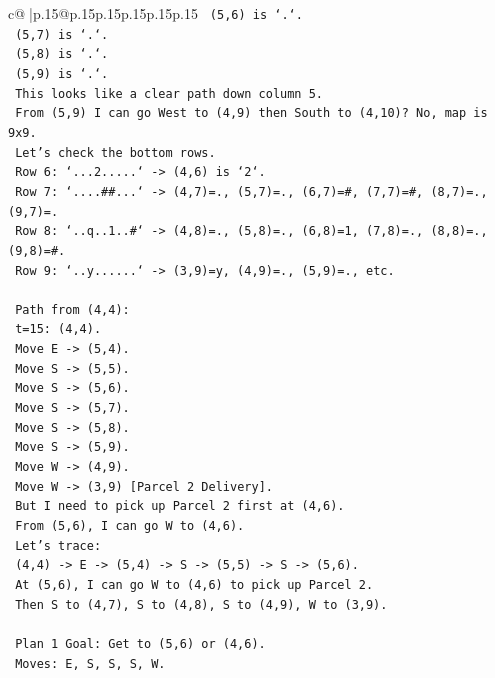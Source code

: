 \documentclass{article}
\begin{document}
{\begin{supertabular}{c@{$\;$}|p{.15\linewidth}@{}p{.15\linewidth}p{.15\linewidth}p{.15\linewidth}p{.15\linewidth}p{.15\linewidth}}
{{{\texttt{   (5,6) is `.`.} \\
\texttt{   (5,7) is `.`.} \\
\texttt{   (5,8) is `.`.} \\
\texttt{   (5,9) is `.`.} \\
\texttt{   This looks like a clear path down column 5.} \\
\texttt{   From (5,9) I can go West to (4,9) then South to (4,10)? No, map is 9x9.} \\
\texttt{   Let's check the bottom rows.} \\
\texttt{   Row 6: `...2.....` {-}> (4,6) is `2`.} \\
\texttt{   Row 7: `....\#\#...` {-}> (4,7)=., (5,7)=., (6,7)=\#, (7,7)=\#, (8,7)=., (9,7)=.} \\
\texttt{   Row 8: `..q..1..\#` {-}> (4,8)=., (5,8)=., (6,8)=1, (7,8)=., (8,8)=., (9,8)=\#.} \\
\texttt{   Row 9: `..y......` {-}> (3,9)=y, (4,9)=., (5,9)=., etc.} \\
\\ 
\texttt{   Path from (4,4):} \\
\texttt{   t=15: (4,4).} \\
\texttt{   Move E {-}> (5,4).} \\
\texttt{   Move S {-}> (5,5).} \\
\texttt{   Move S {-}> (5,6).} \\
\texttt{   Move S {-}> (5,7).} \\
\texttt{   Move S {-}> (5,8).} \\
\texttt{   Move S {-}> (5,9).} \\
\texttt{   Move W {-}> (4,9).} \\
\texttt{   Move W {-}> (3,9) {[}Parcel 2 Delivery{]}.} \\
\texttt{   But I need to pick up Parcel 2 first at (4,6).} \\
\texttt{   From (5,6), I can go W to (4,6).} \\
\texttt{   Let's trace:} \\
\texttt{   (4,4) {-}> E {-}> (5,4) {-}> S {-}> (5,5) {-}> S {-}> (5,6).} \\
\texttt{   At (5,6), I can go W to (4,6) to pick up Parcel 2.} \\
\texttt{   Then S to (4,7), S to (4,8), S to (4,9), W to (3,9).} \\
\\ 
\texttt{   Plan 1 Goal: Get to (5,6) or (4,6).} \\
\texttt{   Moves: E, S, S, S, W.} \\
}}}
\end{supertabular}}
\end{document}
